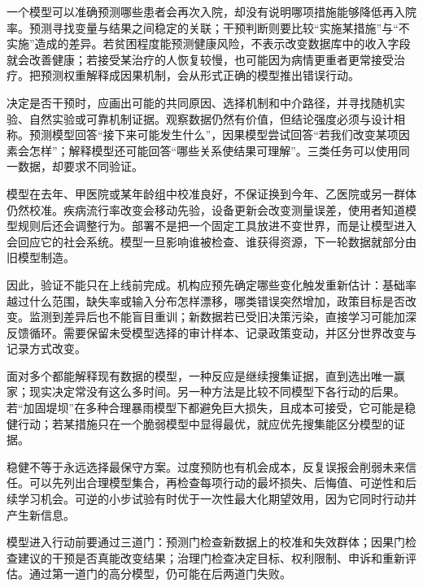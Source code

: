 一个模型可以准确预测哪些患者会再次入院，却没有说明哪项措施能够降低再入院率。预测寻找变量与结果之间稳定的关联；干预判断则要比较“实施某措施”与“不实施”造成的差异。若贫困程度能预测健康风险，不表示改变数据库中的收入字段就会改善健康；若接受某治疗的人恢复较慢，也可能因为病情更重者更常接受治疗。把预测权重解释成因果机制，会从形式正确的模型推出错误行动。

决定是否干预时，应画出可能的共同原因、选择机制和中介路径，并寻找随机实验、自然实验或可靠机制证据。观察数据仍然有价值，但结论强度必须与设计相称。预测模型回答“接下来可能发生什么”，因果模型尝试回答“若我们改变某项因素会怎样”；解释模型还可能回答“哪些关系使结果可理解”。三类任务可以使用同一数据，却要求不同验证。

模型在去年、甲医院或某年龄组中校准良好，不保证换到今年、乙医院或另一群体仍然校准。疾病流行率改变会移动先验，设备更新会改变测量误差，使用者知道模型规则后还会调整行为。部署不是把一个固定工具放进不变世界，而是让模型进入会回应它的社会系统。模型一旦影响谁被检查、谁获得资源，下一轮数据就部分由旧模型制造。

因此，验证不能只在上线前完成。机构应预先确定哪些变化触发重新估计：基础率越过什么范围，缺失率或输入分布怎样漂移，哪类错误突然增加，政策目标是否改变。监测到差异后也不能盲目重训；新数据若已受旧决策污染，直接学习可能加深反馈循环。需要保留未受模型选择的审计样本、记录政策变动，并区分世界改变与记录方式改变。

面对多个都能解释现有数据的模型，一种反应是继续搜集证据，直到选出唯一赢家；现实决定常没有这么多时间。另一种方法是比较不同模型下各行动的后果。若“加固堤坝”在多种合理暴雨模型下都避免巨大损失，且成本可接受，它可能是稳健行动；若某措施只在一个脆弱模型中显得最优，就应优先搜集能区分模型的证据。

稳健不等于永远选择最保守方案。过度预防也有机会成本，反复误报会削弱未来信任。可以先列出合理模型集合，再检查每项行动的最坏损失、后悔值、可逆性和后续学习机会。可逆的小步试验有时优于一次性最大化期望效用，因为它同时行动并产生新信息。

\begin{argumentbox}
模型进入行动前要通过三道门：预测门检查新数据上的校准和失效群体；因果门检查建议的干预是否真能改变结果；治理门检查决定目标、权利限制、申诉和重新评估。通过第一道门的高分模型，仍可能在后两道门失败。
\end{argumentbox}

